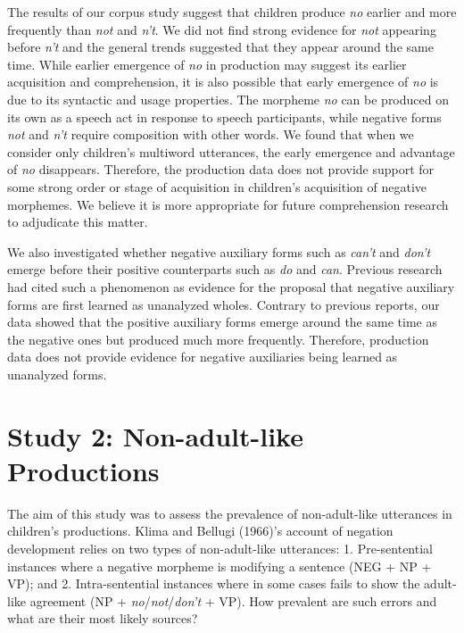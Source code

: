 \documentclass[man,floatsintext,draftall]{apa6}
\begin{document}
The results of our corpus study suggest that children produce \emph{no} earlier and more frequently than \emph{not} and \emph{n't}. We did not find strong evidence for \emph{not} appearing before \emph{n't} and the general trends suggested that they appear around the same time. While earlier emergence of \emph{no} in production may suggest its earlier acquisition and comprehension, it is also possible that early emergence of \emph{no} is due to its syntactic and usage properties. The morpheme \emph{no} can be produced on its own as a speech act in response to speech participants, while negative forms \emph{not} and \emph{n't} require composition with other words. We found that when we consider only children's multiword utterances, the early emergence and advantage of \emph{no} disappears. Therefore, the production data does not provide support for some strong order or stage of acquisition in children's acquisition of negative morphemes. We believe it is more appropriate for future comprehension research to adjudicate this matter.

We also investigated whether negative auxiliary forms such as \emph{can't} and \emph{don't} emerge before their positive counterparts such as \emph{do} and \emph{can}. Previous research had cited such a phenomenon as evidence for the proposal that negative auxiliary forms are first learned as unanalyzed wholes. Contrary to previous reports, our data showed that the positive auxiliary forms emerge around the same time as the negative ones but produced much more frequently. Therefore, production data does not provide evidence for negative auxiliaries being learned as unanalyzed forms.

\hypertarget{study-2-non-adult-like-productions}{%
\section{Study 2: Non-adult-like Productions}\label{study-2-non-adult-like-productions}}

The aim of this study was to assess the prevalence of non-adult-like utterances in children's productions. Klima and Bellugi (1966)'s account of negation development relies on two types of non-adult-like utterances: 1. Pre-sentential instances where a negative morpheme is modifying a sentence (NEG + NP + VP); and 2. Intra-sentential instances where in some cases fails to show the adult-like agreement (NP + \emph{no}/\emph{not}/\emph{don't} + VP). How prevalent are such errors and what are their most likely sources?
\end{document}
